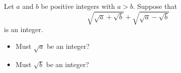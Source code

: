 Let $a$ and $b$ be positive integers with $a>b$.
Suppose that \[\sqrt{\sqrt{a}+\sqrt{b}}+\sqrt{\sqrt{a}-\sqrt{b}}\] is an integer.
\begin{itemize}	
	\item Must $\sqrt{a}$ be an integer?
	\item Must $\sqrt{b}$ be an integer?
\end{itemize}
